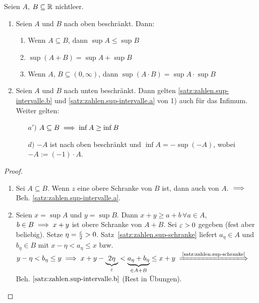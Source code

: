 \documentclass[12pt]{scrreprt}
\begin{document}
\begin{satz}\label{satz:zahlen.sup-intervalle}
Seien $A$, $B \subseteq \mathbb{R}$ nichtleer.
\begin{enumerate}
\item Seien $A$ und $B$ nach oben beschränkt. Dann:
	\begin{enumerate}
	\item \label{satz:zahlen.sup-intervalle.a}
		Wenn $A \subseteq B$, dann $\sup A \le \sup B$
	\item \label{satz:zahlen.sup-intervalle.b}
		$\sup (A+B) = \sup A + \sup B$
	\item \label{satz:zahlen.sup-intervalle.c}
		Wenn $A$, $B \subseteq (0, \infty)$, dann $\sup(A\cdot B) = \sup A \cdot \sup B$
	\end{enumerate}
\item Seien $A$ und $B$ nach unten beschränkt. Dann gelten
	\ref{satz:zahlen.sup-intervalle.b} und \ref{satz:zahlen.sup-intervalle.a} von 1) auch für das Infimum. Weiter gelten:
	\begin{itemize} %
	\item[$a')$] \label{satz:zahlen.sup-intervalle.a2}
	$A \subseteq B \implies \inf A \geq \inf B$
	\item[$d)$] \label{satz:zahlen.sup-intervalle.d}
	$-A$ ist nach oben beschränkt und $\inf A = -\sup(-A)$, wobei $-A:=(-1)\cdot A$.
	\end{itemize}
\end{enumerate}
\end{satz}
\begin{proof}
\begin{enumerate}
\item Sei $A\subseteq B$. Wenn $z$ eine obere Schranke von $B$ ist, dann auch von $A$. $\implies$ Beh. \ref{satz:zahlen.sup-intervalle.a}.
\item Seien $x=\sup A$ und $y = \sup B$. Dann $x+y\ge a+b\,\forall a \in A$, $b\in B \implies x+y $ ist obere Schranke von $A+B$. Sei $\varepsilon >0$
gegeben (fest aber beliebig). Setze  $\eta = \frac{\varepsilon}{2} > 0$. Satz~\ref{satz:zahlen.sup-schranke} liefert $a_\eta \in A$ und 
$b_\eta \in B$ mit $x-\eta < a_\eta \le x$ bzw. $y-\eta < b_\eta \le y
\folgt x+y-\underbrace{2\eta}_\ep < \underbrace{a_\eta + b_\eta}_{\in A+B} \le x+y \folgtnach{\ref{satz:zahlen.sup-schranke}}$ Beh. $\ref{satz:zahlen.sup-intervalle.b}$
(Rest in Übungen).
\end{enumerate}
\end{proof}
\end{document}
